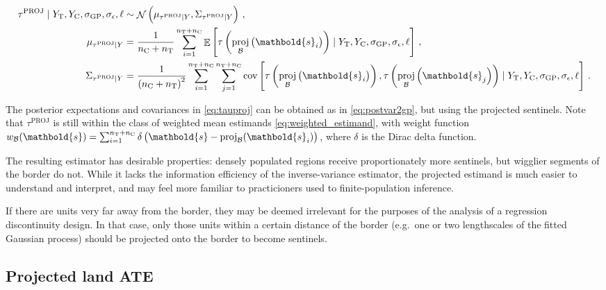 \documentclass[letter]{article}
\DeclareMathOperator{\E}{\mathbb{E}}
\DeclareMathOperator{\cov}{{cov}}
\DeclareMathOperator{\normal}{\mathcal{N}}
\newcommand{\treat}{\mathrm{T}}
\newcommand{\ctrol}{\mathrm{C}}
\newcommand{\sigmaf}{\sigma_{\mathrm{GP}}}
\newcommand{\sigman}{\sigma_{\epsilon}}
\newcommand{\svec}{\mathbold{s}}
\newcommand{\boundary}{\mathcal{B}}
\newcommand{\tauproj}{\tau^{\mathrm{PROJ}}}
\newcommand{\eqlabel}[1]{\label{#1}}
\DeclareMathOperator{\proj}{proj}
\newcommand{\weightb}{w_{\boundary}}
\begin{document}
\begin{equation}\begin{split}
    \tauproj \mid Y_\treat{}, Y_\ctrol{}, \sigmaf, \sigman, \ell &\sim \normal\del{\mu_{\tauproj \mid Y}, \Sigma_{\tauproj \mid Y}}\,, \\
    \mu_{\tauproj \mid Y} &= \frac{1}{n_\ctrol{} + n_\treat{}} \sum_{i=1}^{n_\treat{}+n_\ctrol{}} 
        \E\sbr{
            \tau\del{
                \proj_{\boundary}\del{\svec_i}
            }
            \mid Y_\treat{}, Y_\ctrol{}, \sigmaf, \sigman, \ell
         } \,,\\
    \Sigma_{\tauproj \mid Y} &= \frac{1}{\del{n_\ctrol{} + n_\treat{}}^2}
        \sum_{i=1}^{n_\treat{}+n_\ctrol{}} 
        \sum_{j=1}^{n_\treat{}+n_\ctrol{}} 
        \cov\sbr{
            \tau\del{
                \proj_{\boundary}\del{\svec_i}
            },
            \tau\del{
                \proj_{\boundary}\del{\svec_j}
            }
            \mid Y_\treat{}, Y_\ctrol{}, \sigmaf, \sigman, \ell
        }\,.
\end{split}
\eqlabel{eq:tauproj}
\end{equation}

The posterior expectations and covariances in \eqref{eq:tauproj} can be obtained as in \eqref{eq:postvar2gp}, but using the projected sentinels.
Note that \(\tauproj\) is still within the class of weighted mean estimands \eqref{eq:weighted_estimand},
with weight function \(\weightb(\svec) = \sum_{i=1}^{n_\treat{}+n_\ctrol{}} \delta\del{ \svec - \proj_\boundary(\svec_i)}\), where \(\delta\) is the Dirac delta function.

The resulting estimator has desirable properties: densely populated regions receive proportionately more sentinels, but wigglier segments of the border do not.
While it lacks the information efficiency of the inverse-variance estimator,
the projected estimand is much easier to understand and interpret,
and may feel more familiar to practicioners used to finite-population inference.

If there are units very far away from the border,
they may be deemed irrelevant for the purposes of the analysis of a regression discontinuity design. In that case, only those units within a certain distance of the border (e.g.~one or two lengthscales of the fitted Gaussian process) should be projected onto the border to become sentinels.
    


    	\subsection{Projected land ATE}\label{projected-land-ate}
\end{document}
